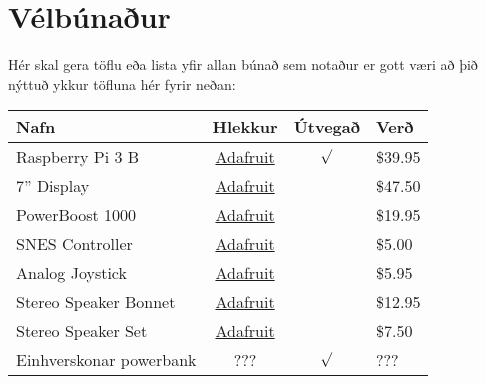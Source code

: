 \section{Vélbúnaður}
Hér skal gera töflu eða lista yfir allan búnað sem notaður er gott væri að þið nýttuð ykkur töfluna hér fyrir neðan:


\begin{tabular}{l c c l}
    \textbf{Nafn} & \textbf{Hlekkur} & \textbf{Útvegað} & \textbf{Verð} \\
    \hline
    Raspberry Pi 3 B & \href{https://www.adafruit.com/products/3055}{Adafruit} & $\surd $& \$39.95\\
    \hline
    7'' Display & \href{https://www.adafruit.com/products/2354}{Adafruit} & & \$47.50\\
    \hline
    PowerBoost 1000 & \href{https://www.adafruit.com/products/2465}{Adafruit} & & \$19.95 \\
    \hline
    SNES Controller & \href{https://www.adafruit.com/products/131}{Adafruit} & & \$5.00 \\
    \hline
    Analog Joystick & \href{https://www.adafruit.com/products/512}{Adafruit} & & \$5.95 \\
    \hline
    Stereo Speaker Bonnet & \href{https://www.adafruit.com/products/3346}{Adafruit} & & \$12.95 \\
    \hline
    Stereo Speaker Set & \href{https://www.adafruit.com/products/1669}{Adafruit} & & \$7.50\\
    \hline
    Einhverskonar powerbank & ??? & $\surd $ & ??? \\
\end{tabular}